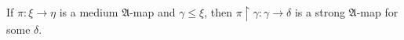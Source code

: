 If $\pi: \xi \rightarrow \eta$ is a medium $\mathfrak{A}$-map and $\gamma \leq \xi$, then $\pi \upharpoonright \gamma: \gamma \rightarrow \delta$ is a strong $\mathfrak{A}$-map for some $\delta$.
